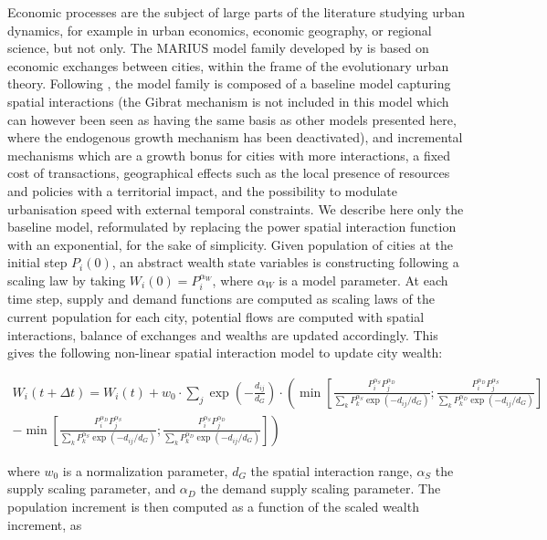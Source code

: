 \documentclass[10pt]{article}
\begin{document}
Economic processes are the subject of large parts of the literature studying urban dynamics, for example in urban economics, economic geography, or regional science, but not only. The MARIUS model family developed by \citep{cottineau2014evolution} is based on economic exchanges between cities, within the frame of the evolutionary urban theory. Following \citep{cottineau2015modular}, the model family is composed of a baseline model capturing spatial interactions (the Gibrat mechanism is not included in this model which can however been seen as having the same basis as other models presented here, where the endogenous growth mechanism has been deactivated), and incremental mechanisms which are a growth bonus for cities with more interactions, a fixed cost of transactions, geographical effects such as the local presence of resources and policies with a territorial impact, and the possibility to modulate urbanisation speed with external temporal constraints. We describe here only the baseline model, reformulated by replacing the power spatial interaction function with an exponential, for the sake of simplicity. Given population of cities at the initial step $P_i(0)$, an abstract wealth state variables is constructing following a scaling law by taking $W_i(0)=P_i^{\alpha_W}$, where $\alpha_W$ is a model parameter. At each time step, supply and demand functions are computed as scaling laws of the current population for each city, potential flows are computed with spatial interactions, balance of exchanges and wealths are updated accordingly. This gives the following non-linear spatial interaction model to update city wealth:

\begin{multline}
	W_i (t + \Delta t) = W_i (t) + w_0 \cdot \sum_j \exp \left( - \frac{d_{ij}}{d_G} \right)	\cdot \left( \min \left[ \frac{P_i^{\alpha_S} P_j^{\alpha_D}}{\sum_k P_k^{\alpha_S} \exp(-d_{ij}/d_G)} ; \frac{P_i^{\alpha_D} P_j^{\alpha_S}}{\sum_k P_k^{\alpha_D} \exp(-d_{ij}/d_G)} \right]\right. \\ \left. - \min \left[ \frac{P_i^{\alpha_D} P_j^{\alpha_S}}{\sum_k P_k^{\alpha_S} \exp(-d_{ij}/d_G)} ; \frac{P_i^{\alpha_S} P_j^{\alpha_D}}{\sum_k P_k^{\alpha_D} \exp(-d_{ij}/d_G)} \right] \right)
\end{multline}

where $w_0$ is a normalization parameter, $d_G$ the spatial interaction range, $\alpha_S$ the supply scaling parameter, and $\alpha_D$ the demand supply scaling parameter. The population increment is then computed as a function of the scaled wealth increment, as
\end{document}
